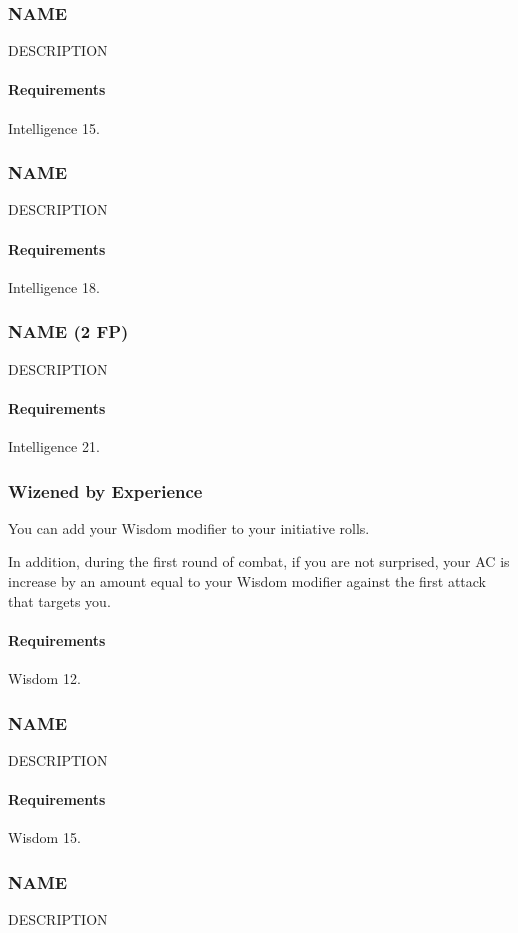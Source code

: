 \subsubsection{NAME} \label{feat::name}
    DESCRIPTION
    \paragraph{Requirements} Intelligence 15.
\subsubsection{NAME} \label{feat::name}
    DESCRIPTION %
    \paragraph{Requirements} Intelligence 18.
\subsubsection{NAME (2 FP)} \label{feat::name}
    DESCRIPTION
    \paragraph{Requirements} Intelligence 21.
\subsubsection{Wizened by Experience} \label{feat::wizenedbyexperience}
    You can add your Wisdom modifier to your initiative rolls.

    In addition, during the first round of combat, if you are not surprised, your AC is increase by an amount equal to your Wisdom modifier against the first attack that targets you.
    \paragraph{Requirements} Wisdom 12.
\subsubsection{NAME} \label{feat::name}
    DESCRIPTION
    \paragraph{Requirements} Wisdom 15.
\subsubsection{NAME} \label{feat::name}
    DESCRIPTION
